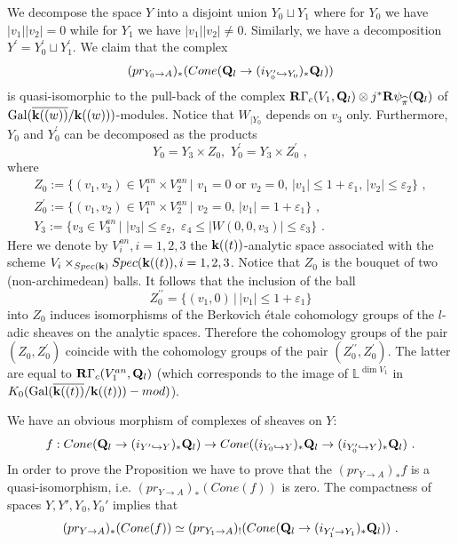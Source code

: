 \documentclass[12pt]{article}
\begin{document}
We decompose the space $Y$ into a disjoint union $Y_0\sqcup Y_1$ where for $Y_0$ we have $|v_1||v_2|=0$ while for $Y_1$ we have $|v_1||v_2|\ne 0$.
Similarly, we have a decomposition $Y^{\prime}=Y_0^{\prime}\sqcup Y_1^{\prime}$. We claim
 that the complex 
$$(pr_{Y_0\to A})_\ast(Cone({\bf Q}_l\to (i_{Y'_0\hookrightarrow Y_0})_*{\bf Q}_l))$$
is quasi-isomorphic to the pull-back of the complex ${\bf R}\Gamma_c(V_1,{\bf Q}_l)\otimes j^{\ast}{\bf R}\psi_{\widehat{\pi}}({\bf Q}_l)$
of $\operatorname{Gal}(\overline{{\bf k}((w))}/{\bf k}((w)))$-modules. Notice that $W_{|Y_0}$ depends on $v_3$ only.
Furthermore, $Y_0$ and $Y_0^{\prime}$ can be decomposed as the products
$$Y_0=Y_3\times Z_0,\,\,Y_0^\prime=Y_3\times Z_0^{\prime}\,\,,$$
where
$$\begin{array}{l}
Z_0:=\{(v_1,v_2)\in V_1^{an}\times V_2^{an}\,|\,\,v_1=0\, \,\mbox{or}\, \,v_2=0,\, |v_1|\le 1+\varepsilon_1, \,|v_2|\le\varepsilon_2\}\,\,,\\
Z_0^{\prime}:=\{(v_1,v_2)\in V_1^{an}\times V_2^{an}\,|\,\,v_2=0,\,|v_1|= 1+\varepsilon_1\}\,\,,\\
Y_3:=\{v_3\in V_3^{an}\,|\,\,|v_3|\le \varepsilon_2,\,\,\varepsilon_4\le |W(0,0,v_3)|\le \varepsilon_3\}\,\,.
\end{array}$$
Here we denote by $V_i^{an}, i=1,2,3$ the ${\bf k}((t))$-analytic space associated with the scheme $V_i\times_{Spec({\bf k})}Spec({\bf k}((t)), i=1,2,3$.
Notice that $Z_0$ is the bouquet of two (non-archimedean) balls. It follows that  the inclusion of the ball 
$$Z_0^{\prime\prime}=\{(v_1,0)\,|\,|v_1|\le 1+\varepsilon_1\}$$ into $Z_0$ induces isomorphisms of the Berkovich \'etale cohomology groups of the $l$-adic sheaves on the analytic spaces. Therefore the cohomology groups of the pair $(Z_0,Z_0^{\prime})$ coincide with the cohomology groups of the pair $(Z_0^{\prime\prime},Z_0^{\prime})$.
The latter  are
equal to ${\bf R}\Gamma_c(V_1^{an},{\bf Q}_l)$ (which corresponds to the image of ${\mathbb L}^{\dim V_1}$ in $K_0(\operatorname{Gal}(\overline{{\bf k}((t))}/{\bf k}((t)))-mod)$).

We have an obvious morphism of complexes of sheaves on $Y$:
$$ f:Cone({\bf Q}_l\to (i_{Y'\hookrightarrow Y})_*{\bf Q}_l) \to 
Cone ((i_{Y_0\hookrightarrow Y})_*{\bf Q}_l\to (i_{Y'_0\hookrightarrow Y})_*{\bf Q}_l)\,\,.$$
In order to prove the Proposition we have to prove that the $(pr_{Y\to A})_*f$ is a quasi-isomorphism, i.e.
 $(pr_{Y\to A})_*(Cone(f))$ is zero. The compactness of spaces $Y,Y',Y_0,Y_0'$ implies that 
$$(pr_{Y\to A})_*(Cone(f))\simeq (pr_{Y_1\to A})_!(Cone({\bf Q}_l\to (i_{Y_1'\to Y_1})_\ast {\bf Q}_l ))\,\,. $$
\end{document}
